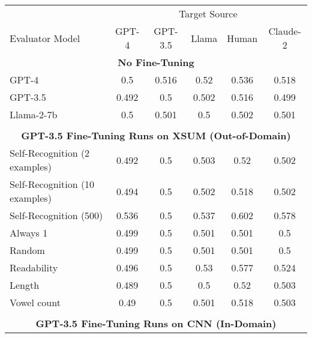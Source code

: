\begin{table}[h]
    \centering
    \begin{tabular}{l|ccccc}
                                           & \multicolumn{5}{c}{Target Source} \\ 
        Evaluator Model                    & GPT-4 & GPT-3.5 & Llama & Human & Claude-2 \\
        \hline
        \multicolumn{6}{c}{\textbf{No Fine-Tuning}} \\
        GPT-4                              & 0.5         & 0.516       & 0.52        & 0.536       & 0.518       \\
        GPT-3.5                            & 0.492       & 0.5         & 0.502       & 0.516       & 0.499       \\
        Llama-2-7b                         & 0.5         & 0.501       & 0.5         & 0.502       & 0.501       \\
        \multicolumn{6}{c}{} \\
        \multicolumn{6}{c}{\textbf{GPT-3.5 Fine-Tuning Runs on XSUM (Out-of-Domain)}} \\
        Self-Recognition (2 examples)              & 0.492       & 0.5         & 0.503       & 0.52        & 0.502       \\
        Self-Recognition (10 examples)             & 0.494       & 0.5         & 0.502       & 0.518       & 0.502       \\
        Self-Recognition (500)                     & 0.536       & 0.5         & 0.537       & 0.602       & 0.578       \\
        Always 1                           & 0.499       & 0.5         & 0.501       & 0.501       & 0.5         \\
        Random                             & 0.499       & 0.5         & 0.501       & 0.501       & 0.5         \\
        Readability                        & 0.496       & 0.5         & 0.53        & 0.577       & 0.524       \\
        Length                             & 0.489       & 0.5         & 0.5         & 0.52        & 0.503       \\
        Vowel count                        & 0.49        & 0.5         & 0.501       & 0.518       & 0.503       \\
        \multicolumn{6}{c}{} \\
        \multicolumn{6}{c}{\textbf{GPT-3.5 Fine-Tuning Runs on CNN (In-Domain)}} \\

\end{tabular}
\end{table}
